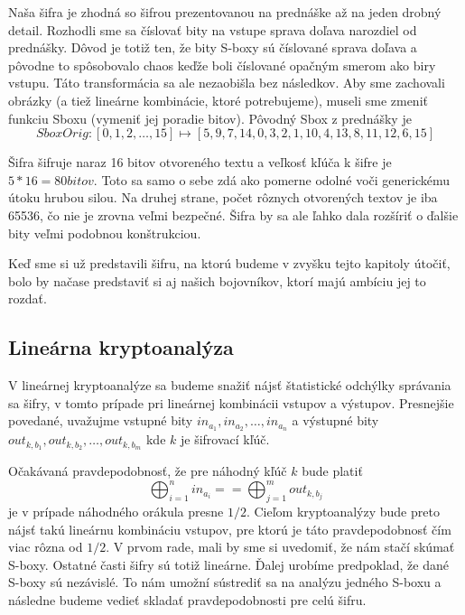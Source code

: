 \begin{poznamka}
    Naša šifra je zhodná so šifrou prezentovanou na prednáške až na
    jeden drobný detail. Rozhodli sme sa číslovať bity na vstupe
    sprava doľava narozdiel od prednášky. Dôvod je totiž ten, že bity
    S-boxy sú číslované sprava doľava a pôvodne to spôsobovalo chaos
    keďže boli číslované opačným smerom ako biry vstupu. Táto
    transformácia sa ale nezaobišla bez následkov. Aby sme zachovali
    obrázky (a tiež lineárne kombinácie, ktoré potrebujeme), museli
    sme zmeniť funkciu Sboxu (vymeniť jej poradie bitov).
    Pôvodný Sbox z prednášky je
    \begin{equation*}
    SboxOrig:[0,1,2,\dots,15] \mapsto
    [5, 9, 7, 14, 0, 3, 2, 1, 10, 4, 13, 8, 11, 12, 6, 15]
    \end{equation*}
\end{poznamka}

Šifra šifruje naraz 16 bitov otvoreného textu a 
veľkosť kľúča k šifre je $5*16=80\unit{bitov}$.
Toto sa samo o sebe zdá ako pomerne odolné voči generickému útoku
hrubou silou. Na druhej strane, počet rôznych otvorených textov je iba
65536, čo nie je zrovna veľmi bezpečné. Šifra by sa ale ľahko dala
rozšíriť o ďalšie bity veľmi podobnou konštrukciou.

Keď sme si už predstavili šifru, na ktorú budeme v zvyšku tejto
kapitoly útočiť, bolo by načase predstaviť si aj našich bojovníkov,
ktorí majú ambíciu jej to rozdať.

\subsection{Lineárna kryptoanalýza}

V lineárnej kryptoanalýze sa budeme snažiť nájsť štatistické odchýlky
správania sa šifry, v tomto prípade pri lineárnej kombinácii vstupov a
výstupov. Presnejšie povedané, uvažujme vstupné bity
$in_{a_1},in_{a_2},\dots,in_{a_n}$ a výstupné bity
$out_{k,b_1},out_{k,b_2},\dots,out_{k,b_m}$ kde $k$ je šifrovací kľúč.

Očakávaná pravdepodobnosť, že pre náhodný kľúč $k$ bude platiť
\begin{equation*}
    \bigoplus_{i=1}^n in_{a_i} == \bigoplus_{j=1}^{m} out_{k,b_j}
\end{equation*}
je v prípade náhodného orákula presne $1/2$. Cieľom kryptoanalýzy bude
preto nájsť takú lineárnu kombináciu vstupov, pre ktorú je táto
pravdepodobnosť čím viac rôzna od $1/2$. V prvom rade, mali by sme si
uvedomiť, že nám stačí skúmať S-boxy. Ostatné časti šifry sú totiž
lineárne. Ďalej urobíme predpoklad, že dané S-boxy sú nezávislé. To
nám umožní sústrediť sa na analýzu jedného S-boxu a následne budeme
vedieť skladať pravdepodobnosti pre celú šifru.


